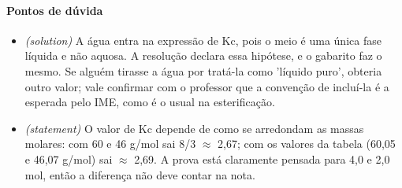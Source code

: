 \documentclass{article}%
\begin{document}
\paragraph{Pontos de dúvida}%
\begin{itemize}%
\item%
\textit{(solution)} A água entra na expressão de Kc, pois o meio é uma única fase líquida e não aquosa. A resolução declara essa hipótese, e o gabarito faz o mesmo. Se alguém tirasse a água por tratá{-}la como 'líquido puro', obteria outro valor; vale confirmar com o professor que a convenção de incluí{-}la é a esperada pelo IME, como é o usual na esterificação.%
\item%
\textit{(statement)} O valor de Kc depende de como se arredondam as massas molares: com 60 e 46 g/mol sai 8/3 $\approx$ 2,67; com os valores da tabela (60,05 e 46,07 g/mol) sai $\approx$ 2,69. A prova está claramente pensada para 4,0 e 2,0 mol, então a diferença não deve contar na nota.%
\end{itemize}%
\end{document}
